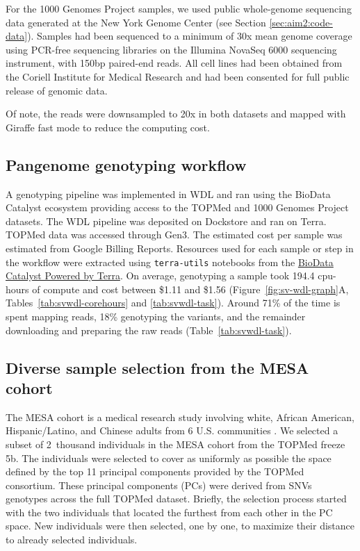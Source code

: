\documentclass[11pt]{ucscthesis}
\begin{document}
For the 1000 Genomes Project samples, we used public whole-genome sequencing data generated at the New York Genome Center\cite{1000gp_nygc_2021} (see Section \ref{sec:aim2:code-data}).
Samples had been sequenced to a minimum of 30x mean genome coverage using PCR-free sequencing libraries on the Illumina NovaSeq 6000 sequencing instrument, with 150bp paired-end reads.
All cell lines had been obtained from the Coriell Institute for Medical Research and had been consented for full public release of genomic data.

Of note, the reads were downsampled to 20x in both datasets and mapped with Giraffe fast mode to reduce the computing cost.


\subsection{Pangenome genotyping workflow}

A genotyping pipeline was implemented in WDL and ran using the BioData Catalyst ecosystem\cite{bdc2020} providing access to the TOPMed and 1000 Genomes Project datasets.
The WDL pipeline was deposited on Dockstore\cite{vgsv_dockstore} and ran on Terra.
TOPMed data was accessed through Gen3.
The estimated cost per sample was estimated from Google Billing Reports.
Resources used for each sample or step in the workflow were extracted using \texttt{terra-utils} notebooks from the \href{https://biodatacatalyst.nhlbi.nih.gov/platforms/terra}{BioData Catalyst Powered by Terra}.
On average, genotyping a sample took 194.4 cpu-hours of compute and cost between \$1.11 and \$1.56 (Figure~\ref{fig:sv-wdl-graph}A, Tables~\ref{tab:svwdl-corehours} and \ref{tab:svwdl-task}).
Around 71\% of the time is spent mapping reads, 18\% genotyping the variants, and the remainder downloading and preparing the raw reads (Table~\ref{tab:svwdl-task}).



\subsection{Diverse sample selection from the MESA cohort}
\label{subsec:aim2:mesaselection}

The MESA cohort is a medical research study involving white, African American, Hispanic/Latino, and Chinese adults from 6 U.S. communities \cite{bild2002multi}.
We selected a subset of 2~thousand individuals in the MESA cohort from the TOPMed freeze 5b.
The individuals were selected to cover as uniformly as possible the space defined by the top 11 principal components provided by the TOPMed consortium.
These principal components (PCs) were derived from SNVs genotypes across the full TOPMed dataset.
Briefly, the selection process started with the two individuals that located the furthest from each other in the PC space.
New individuals were then selected, one by one, to maximize their distance to already selected individuals.
\end{document}
